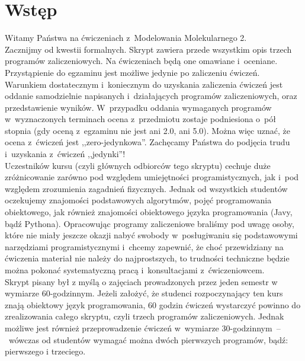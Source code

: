 \documentclass[a4paper,11pt,twoside]{book}
\begin{document}
\pagestyle{fancy}
\fancyhf{}
\lhead{\chaptername{} \thechapter}
\rhead{\thepage}


\chapter{Wstęp}
Witamy Państwa na ćwiczeniach z~Modelowania Molekularnego 2.\\

Zacznijmy od kwestii formalnych. Skrypt zawiera przede wszystkim opis trzech programów zaliczeniowych. Na ćwiczeniach będą one omawiane i~oceniane.
Przystąpienie do egzaminu jest możliwe jedynie po zaliczeniu ćwiczeń. Warunkiem dostatecznym i~koniecznym do uzyskania zaliczenia ćwiczeń jest oddanie samodzielnie napisanych i~działających programów zaliczeniowych, oraz przedstawienie wyników.
W~przypadku oddania wymaganych programów w~wyznaczonych terminach ocena z~przedmiotu zostaje podniesiona o~pół stopnia (gdy oceną z~egzaminu nie jest ani 2.0, ani 5.0). Można więc uznać, że ocena z~ćwiczeń jest ,,zero-jedynkowa''. Zachęcamy Państwa do podjęcia trudu i~uzyskania z~ćwiczeń ,,jedynki''!\\

Uczestników kursu (czyli głównych odbiorców tego skryptu) cechuje duże zróżnicowanie zarówno pod względem umiejętności programistycznych, jak i~pod względem zrozumienia zagadnień fizycznych.
Jednak od wszystkich studentów oczekujemy znajomości podstawowych algorytmów, pojęć programowania obiektowego, jak również znajomości obiektowego języka programowania (Javy, bądź Pythona). Opracowując programy zaliczeniowe braliśmy pod uwagę osoby, które nie miały jeszcze okazji nabyć swobody w~posługiwaniu się podstawowymi narzędziami programistycznymi i~chcemy zapewnić, że choć przewidziany na ćwiczenia materiał nie należy do najprostszych, to trudności techniczne będzie można pokonać systematyczną pracą i~konsultacjami z~ćwiczeniowcem. \\

Skrypt pisany był z myślą o zajęciach prowadzonych przez jeden semestr w wymiarze 60-godzinnym.
Jeżeli założyć, że studenci rozpoczynający ten kurs znają obiektowy język programowania, 60 godzin ćwiczeń wystarczyć powinno do zrealizowania całego skryptu, czyli trzech programów zaliczeniowych.
Jednak możliwe jest również przeprowadzenie ćwiczeń w~wymiarze 30-godzinnym~--~wówczas od studentów wymagać można dwóch pierwszych programów, bądź: pierwszego i trzeciego.\\
\end{document}
